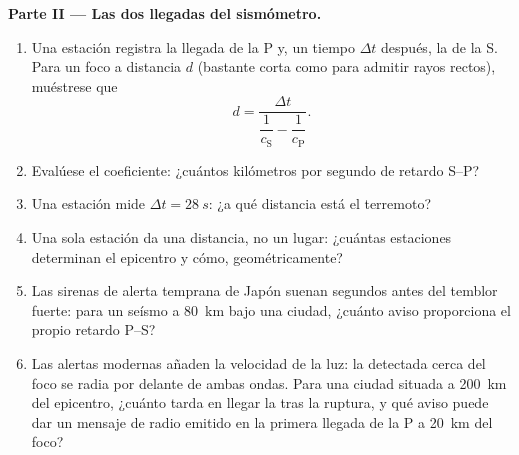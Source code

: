 \begin{problem}
\medskip\noindent\textbf{Parte II --- Las dos llegadas del sismómetro.}
\begin{enumerate}[resume]
  \item Una estación registra la llegada de la P y, un tiempo $\Delta t$
        después, la de la S. Para un foco a distancia $d$ (bastante
        corta como para admitir rayos rectos), muéstrese que
        \[
        d = \frac{\Delta t}{\dfrac{1}{c_{\text{S}}} -
        \dfrac{1}{c_{\text{P}}}} .
        \]
  \item Evalúese el coeficiente: ¿cuántos kilómetros por segundo de
        retardo S--P?
  \item Una estación mide $\Delta t = \qty{28}{s}$: ¿a qué distancia
        está el terremoto?
  \item Una sola estación da una distancia, no un lugar: ¿cuántas
        estaciones determinan el epicentro y cómo, geométricamente?
  \item Las sirenas de alerta temprana de Japón suenan segundos antes
        del temblor fuerte: para un seísmo a \qty{80}{km} bajo una
        ciudad, ¿cuánto aviso proporciona el propio retardo P--S?
  \item Las alertas modernas añaden la velocidad de la luz: la 
        detectada cerca del foco se radia por delante de ambas ondas.
        Para una ciudad situada a \qty{200}{km} del epicentro, ¿cuánto
        tarda en llegar la  tras la ruptura, y qué aviso puede
        dar un mensaje de radio emitido en la primera llegada de la P a
        \qty{20}{km} del foco?
\end{enumerate}


\end{problem}
